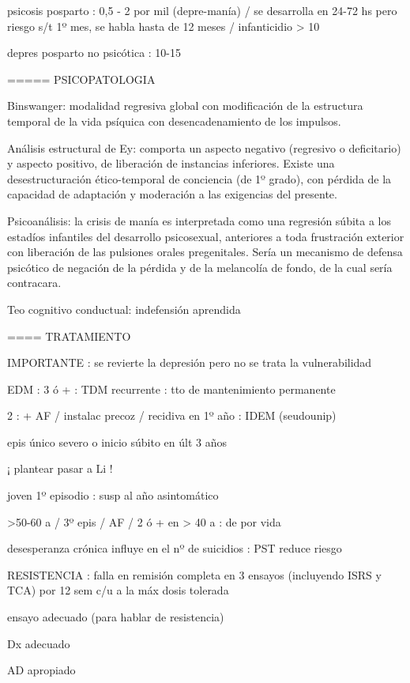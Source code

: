 psicosis posparto : 0,5 - 2 por mil (depre-manía) / se desarrolla en 24-72 hs pero riesgo s/t 1º mes, se habla hasta de 12 meses / infanticidio > 10%

depres posparto no psicótica : 10-15%

===== PSICOPATOLOGIA

Binswanger: modalidad regresiva global con modificación de la estructura temporal de la vida psíquica con desencadenamiento de los impulsos.

Análisis estructural de Ey: comporta un aspecto negativo (regresivo o deficitario) y aspecto positivo, de liberación de instancias inferiores. Existe una desestructuración ético-temporal de conciencia (de 1º grado), con pérdida de la capacidad de adaptación y moderación a las exigencias del presente.

Psicoanálisis: la crisis de manía es interpretada como una regresión súbita a los estadíos infantiles del desarrollo psicosexual, anteriores a toda frustración exterior con liberación de las pulsiones orales pregenitales. Sería un mecanismo de defensa psicótico de negación de la pérdida y de la melancolía de fondo, de la cual sería contracara.

Teo cognitivo conductual: indefensión aprendida

==== TRATAMIENTO

IMPORTANTE : se revierte la depresión pero no se trata la vulnerabilidad

EDM : 3 ó + : TDM recurrente : tto de mantenimiento permanente

2 : + AF / instalac precoz / recidiva en 1º año : IDEM (seudounip)

epis único severo o inicio súbito en últ 3 años

¡ plantear pasar a Li !

joven 1º episodio : susp al año asintomático

>50-60 a / 3º epis / AF / 2 ó + en > 40 a : de por vida

desesperanza crónica influye en el nº de suicidios : PST reduce riesgo

RESISTENCIA : falla en remisión completa en 3 ensayos (incluyendo ISRS y TCA) por 12 sem c/u a la máx dosis tolerada

ensayo adecuado (para hablar de resistencia)

Dx adecuado

AD apropiado

